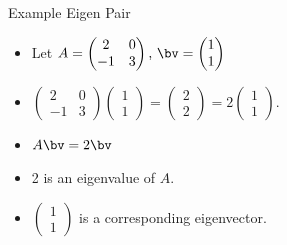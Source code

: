 \documentclass{beamer}
\begin{document}
\begin{frame}{Example Eigen Pair}

\begin{itemize}
\item Let
$A=
\begin{pmatrix}
2 & 0 \\
-1 & 3
\end{pmatrix}
\text{, }
\bv=
\begin{pmatrix}
1 \\
1
\end{pmatrix}
$
\item
$
\begin{pmatrix}
2 & 0 \\
-1 & 3
\end{pmatrix}
\begin{pmatrix}
1 \\
1
\end{pmatrix}
=
\begin{pmatrix}
2 \\
2
\end{pmatrix}
= 2
\begin{pmatrix}
1 \\
1
\end{pmatrix}
.
$
\item $A\bv = 2 \bv$
\item 2 is an eigenvalue of $A$.
\item
$
\begin{pmatrix}
1 \\
1
\end{pmatrix}
$
is a corresponding eigenvector.
\end{itemize}
\end{frame}

\end{document}

